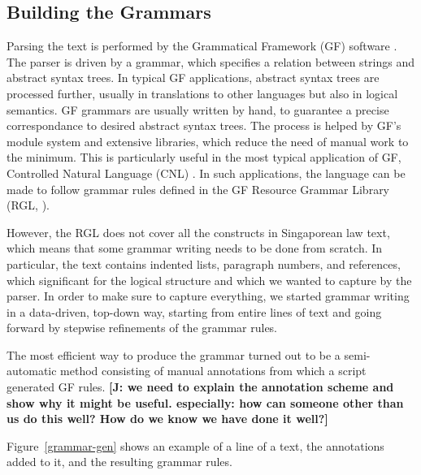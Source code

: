 \documentclass{IOS-Book-Article}
\newcommand{\todoj}[1]{{\color{red}\textbf{[J: #1]}}}
\begin{document}
\subsection{Building the Grammars}

Parsing the text is performed by the Grammatical Framework (GF) software \cite{ranta-2011}.
The parser is driven by a grammar, which specifies a relation between strings and abstract syntax trees. In typical GF applications, abstract syntax trees are processed further, usually in translations to other languages but also in logical semantics. GF grammars are usually written by hand, to guarantee a precise correspondance to desired abstract syntax trees. The process is helped by GF's module system and extensive libraries, which reduce the need of manual work to the minimum. This is particularly useful in the most typical application of GF, Controlled Natural Language (CNL) \cite{fuchs-al-2008,angelov-ranta-2009}. In such applications, the language can be made to follow grammar rules defined in the GF Resource Grammar Library (RGL, \cite{ranta-2009}).

However, the RGL does not cover all the constructs in Singaporean law text, which means that some grammar writing needs to be done from scratch. In particular, the text contains indented lists, paragraph numbers, and references, which significant for the logical structure and which we wanted to capture by the parser. In order to make sure to capture everything, we started grammar writing in a data-driven, top-down way, starting from entire lines of text and going forward by stepwise refinements of the grammar rules.

The most efficient way to produce the grammar turned out to be a semi-automatic method consisting of manual annotations from which a script generated GF rules.
\todoj{we need to explain the annotation scheme and show why it might be useful. especially: how can someone other than us do this well? How do we know we have done it well?}

Figure~\ref{grammar-gen} shows an example of a line of a text, the annotations added to it, and the resulting grammar rules.
\end{document}
